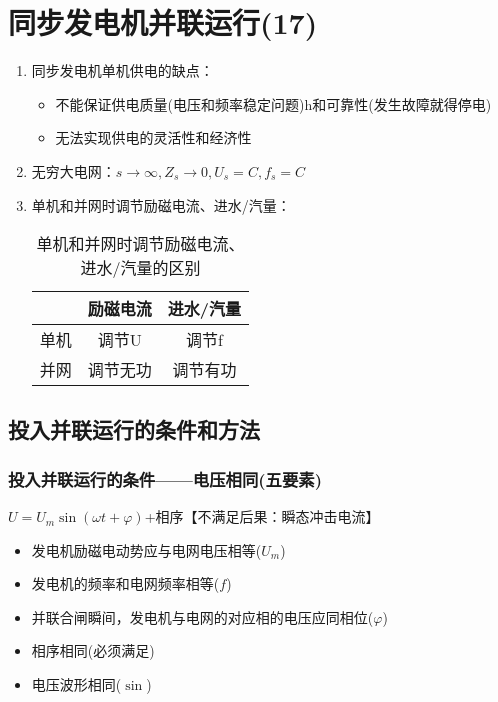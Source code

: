 \documentclass[blue]{elegantnote}
\begin{document}
\chapter{同步发电机并联运行(17)}
\begin{enumerate}
	\item 同步发电机单机供电的缺点：
	\begin{itemize}
		\item 不能保证供电质量(电压和频率稳定问题)h和可靠性(发生故障就得停电)
		\item 无法实现供电的灵活性和经济性
	\end{itemize}
	\item 无穷大电网：$s\to\infty,Z_s\to0,U_s=C,f_s=C$
	\item 单机和并网时调节励磁电流、进水/汽量：
	\begin{table}[htbp]
		\centering
		\caption{单机和并网时调节励磁电流、进水/汽量的区别}
		\begin{tabular}{|c|c|c|}
			\hline
			& 励磁电流  & 进水/汽量 \\
			\hline
			单机    & 调节U   & 调节f \\
			\hline
			并网    & 调节无功  & 调节有功 \\
			\hline
		\end{tabular}%
	\end{table}%
	
\end{enumerate}
\section{投入并联运行的条件和方法}
\subsection{投入并联运行的条件——电压相同(五要素)}
$U=U_m\sin(\omega t+\varphi)$+相序【不满足后果：瞬态冲击电流】
\begin{itemize}
	\item 发电机励磁电动势应与电网电压相等($U_m$)
	\item 发电机的频率和电网频率相等($f$)
	\item 并联合闸瞬间，发电机与电网的对应相的电压应同相位($\varphi$)
	\item {\color{thid}相序相同(必须满足)}
	\item 电压波形相同($\sin$)
\end{itemize}
\end{document}
